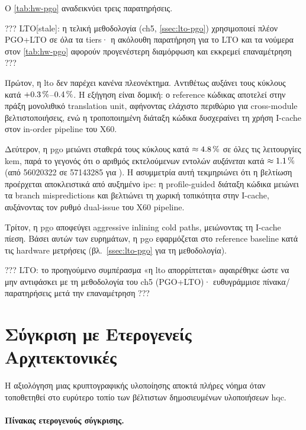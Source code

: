 Ο \cref{tab:hw-pgo} αναδεικνύει τρεις παρατηρήσεις.

??? LTO[stale]: η τελική μεθοδολογία (ch5, \cref{ssec:lto-pgo}) χρησιμοποιεί πλέον PGO+LTO σε όλα τα tiers· η ακόλουθη παρατήρηση για το LTO και τα νούμερα στον \cref{tab:hw-pgo} αφορούν προγενέστερη διαμόρφωση και εκκρεμεί επαναμέτρηση ???

Πρώτον, η
\gls{lto} δεν παρέχει κανένα πλεονέκτημα. Αντιθέτως αυξάνει τους κύκλους
κατά $+\SI{0.3}{\percent}$–$\SI{0.4}{\percent}$. Η εξήγηση είναι δομική: ο reference κώδικας
αποτελεί στην πράξη μονολιθικό translation unit, αφήνοντας ελάχιστο περιθώριο
για cross-module βελτιστοποιήσεις, ενώ η τροποποιημένη διάταξη κώδικα δυσχεραίνει
τη χρήση I-cache στον in-order pipeline του X60.

Δεύτερον, η \gls{pgo} μειώνει σταθερά τους κύκλους κατά $\approx\SI{4.8}{\percent}$
σε όλες τις λειτουργίες \gls{kem}, παρά το γεγονός ότι ο αριθμός εκτελούμενων
εντολών \emph{αυξάνεται} κατά $\approx\SI{1.1}{\percent}$ (από \num{56020322} σε
\num{57143285} για \Decaps). Η ασυμμετρία αυτή τεκμηριώνει ότι η βελτίωση
προέρχεται αποκλειστικά από αυξημένο \gls{ipc}: η profile-guided
διάταξη κώδικα μειώνει τα branch mispredictions και βελτιώνει τη χωρική
τοπικότητα στην I-cache, αυξάνοντας τον ρυθμό dual-issue του X60 pipeline.

Τρίτον, η \gls{pgo} αποφεύγει aggressive
inlining cold paths, μειώνοντας τη I-cache πίεση. Βάσει αυτών των ευρημάτων,
η \gls{pgo} εφαρμόζεται στο reference baseline κατά τις hardware μετρήσεις
(βλ.\ \cref{ssec:lto-pgo} για τη μεθοδολογία).

??? LTO: το προηγούμενο συμπέρασμα «η \gls{lto} απορρίπτεται» αφαιρέθηκε 
ώστε να μην αντιφάσκει με τη μεθοδολογία του ch5 (PGO+LTO)· ευθυγράμμισε 
πίνακα/παρατηρήσεις μετά την επαναμέτρηση ???
\fi

\section{Σύγκριση με Ετερογενείς Αρχιτεκτονικές}
\label{sec:cross-architecture}

Η αξιολόγηση μιας κρυπτογραφικής υλοποίησης αποκτά πλήρες νόημα όταν
τοποθετηθεί στο ευρύτερο τοπίο των βέλτιστων δημοσιευμένων υλοποιήσεων \gls{hqc}.

\paragraph{Πίνακας ετερογενούς σύγκρισης.}
\label{ssec:cross-arch-table}

